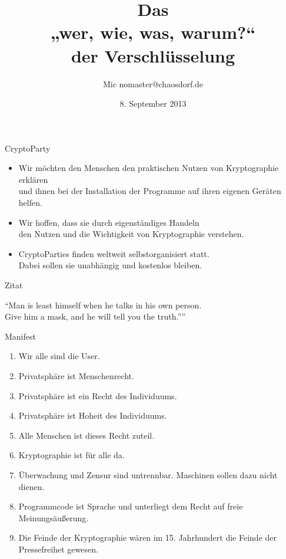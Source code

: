 \documentclass[aspectratio=1610]{beamer}
\title{Das\\„wer, wie, was, warum?“\\der Verschlüsselung}
\author[Mic]{Mic \flq nomaster@chaosdorf.de\frq}
\institute[chaosdorf]{Chaos Computer Club Düsseldorf / Chaosdorf e.V.}
\date[]{8. September 2013}
\renewcommand{\quote}[2]
{
  \begin{exampleblock}{}
    {\large “#1”}
    \vskip5mm
    \hspace*\fill{\small--- #2}
  \end{exampleblock}
}
\begin{document}
  \begin{frame}
    \titlepage
  \end{frame}

  \begin{frame}{CryptoParty}
    \begin{itemize}
      \item
        Wir möchten den Menschen den praktischen Nutzen von Kryptographie erklären\\
        und ihnen bei der Installation der Programme auf ihren eigenen Geräten helfen.
    \pause
      \item
        Wir hoffen, dass sie durch eigenständiges Handeln\\
        den Nutzen und die Wichtigkeit von Kryptographie verstehen.
    \pause
      \item
        CryptoParties finden weltweit selbstorganisiert statt.\\
        Dabei sollen sie unabhängig und kostenlos bleiben.
    \end{itemize}
  \end{frame}

  \begin{frame}{Zitat}
    \quote{Man is least himself when he talks in his own person.\\
      Give him a mask, and he will tell you the truth.”}
      {Oscar Wilde}
  \end{frame}
  \begin{frame}{Manifest}
    \begin{enumerate}
      \pause
      \item Wir alle sind die User.
      \pause
      \item Privatsphäre ist Menschenrecht.
      \pause
      \item Privatsphäre ist ein Recht des Individuums.
      \pause
      \item Privatsphäre ist Hoheit des Individuums.
      \pause
      \item Alle Menschen ist dieses Recht zuteil.
      \pause
      \item Kryptographie ist für alle da.
      \pause
      \item Überwachung und Zensur sind untrennbar. Maschinen sollen dazu nicht dienen.
      \pause
      \item Programmcode ist Sprache und unterliegt dem Recht auf freie Meinungsäußerung.
      \pause
      \item Die Feinde der Kryptographie wären im 15. Jahrhundert die Feinde der Pressefreihet gewesen.
    \end{enumerate}
  \end{frame}
\end{document}
